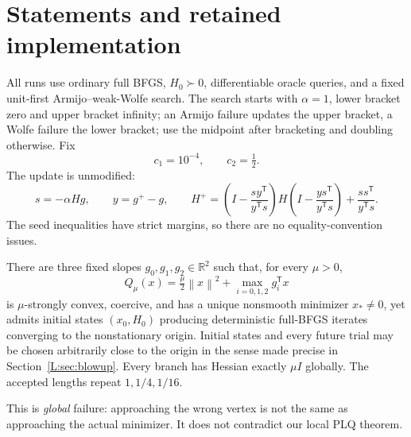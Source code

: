 \begingroup
\providecommand{\R}{}
\renewcommand{\R}{\mathbb R}
\providecommand{\T}{}
\renewcommand{\T}{^{\mathsf T}}
\providecommand{\norm}{}
\renewcommand{\norm}[1]{\left\lVert#1\right\rVert}
\providecommand{\ip}{}
\renewcommand{\ip}[2]{\langle #1,#2\rangle}
\setcounter{section}{0}
\setcounter{theorem}{0}
\setcounter{lemma}{0}
\setcounter{corollary}{0}
\setcounter{proposition}{0}
\setcounter{remark}{0}
\setcounter{equation}{0}
\section{Statements and retained implementation}
All runs use ordinary full BFGS, $H_0\succ0$, differentiable oracle queries, and a fixed unit-first Armijo--weak-Wolfe search. The search starts with $\alpha=1$, lower bracket zero and upper bracket infinity; an Armijo failure updates the upper bracket, a Wolfe failure the lower bracket; use the midpoint after bracketing and doubling otherwise. Fix
\[
 c_1=10^{-4},\qquad c_2=\tfrac12.
\]
The update is unmodified:
\[
 s=-\alpha Hg,\qquad y=g^+-g,\qquad
 H^+=\left(I-\frac{sy\T}{y\T s}\right)H
 \left(I-\frac{ys\T}{y\T s}\right)+\frac{ss\T}{y\T s}.
\]
The seed inequalities have strict margins, so there are no equality-convention issues.

\begin{theorem}\label{L:thm:global}
There are three fixed slopes $g_0,g_1,g_2\in\R^2$ such that, for every $\mu>0$,
\[
 Q_\mu(x)=\tfrac\mu2\norm{x}^2+\max_{i=0,1,2}g_i\T x
\]
is $\mu$-strongly convex, coercive, and has a unique nonsmooth minimizer $x_*\ne0$, yet admits initial states $(x_0,H_0)$ producing deterministic full-BFGS iterates converging to the nonstationary origin. Initial states and every future trial may be chosen arbitrarily close to the origin in the sense made precise in Section~\ref{L:sec:blowup}. Every branch has Hessian exactly $\mu I$ globally. The accepted lengths repeat $1,1/4,1/16$.
\end{theorem}
\noindent This is \emph{global} failure: approaching the wrong vertex is not the same as approaching the actual minimizer. It does not contradict our local PLQ theorem.

